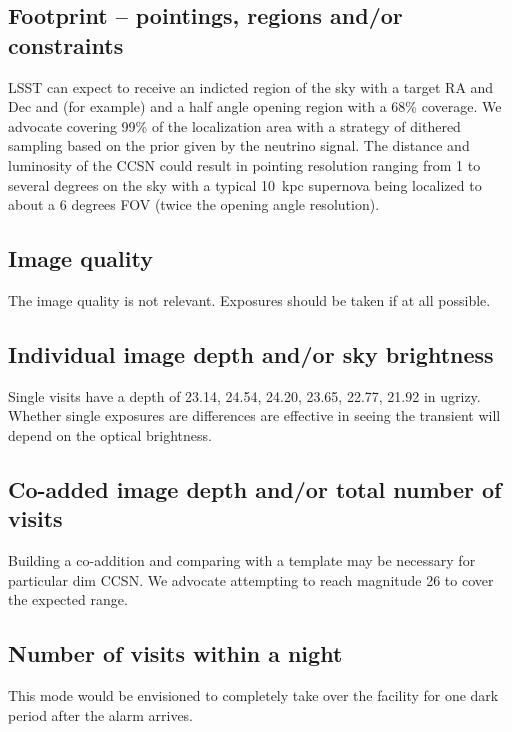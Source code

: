 \documentclass[11pt, letterpaper]{article}
\begin{document}
\subsection{Footprint -- pointings, regions and/or constraints}

LSST can expect to receive an indicted region of the sky with a target
RA and Dec and (for example) and a half angle opening region with a
68\% coverage.  We advocate covering 99\% of the
localization area with a strategy of
dithered sampling based on the prior given by the neutrino signal.
The distance and luminosity of the CCSN could result in pointing
resolution ranging from 1 to several degrees on the sky with a typical
10~kpc supernova being localized to about a 6 degrees FOV (twice the
opening angle resolution).

\subsection{Image quality}

The image quality is not relevant.  Exposures should be taken if at all possible.

\subsection{Individual image depth and/or sky brightness}

Single visits have a depth of 23.14,  24.54, 24.20, 23.65, 22.77,
21.92 in ugrizy.  Whether single exposures are differences are
effective in seeing the transient will depend on the optical brightness.

\subsection{Co-added image depth and/or total number of visits}

Building a co-addition and comparing with a template may be necessary
for particular dim CCSN.  We advocate attempting to reach magnitude 26
to cover the expected range.

\subsection{Number of visits within a night}

This mode would be envisioned to completely take over the facility for
one dark period after the alarm arrives.
\end{document}
